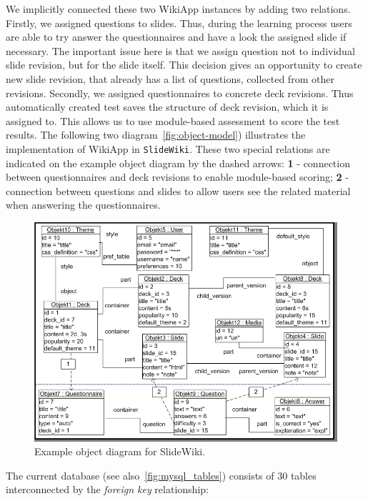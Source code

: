 \documentclass[PhD, Submit, ngerman,UKenglish,table]{scrbook}
\begin{document}
We implicitly connected these two WikiApp instances by adding two relations.
Firstly, we assigned questions to slides.
Thus, during the learning process users are able to try answer the questionnaires and have a look the assigned slide if necessary.
The important issue here is that we assign question not to individual slide revision, but for the slide itself.
This decision gives an opportunity to create new slide revision, that already has a list of questions, collected from other revisions.
Secondly, we assigned questionnaires to concrete deck revisions.
Thus automatically created test saves the structure of deck revision, which it is assigned to.
This allows us to use module-based assessment to score the test results.
The following two diagram~\autoref{fig:object-model}) illustrates the implementation of WikiApp in \texttt{SlideWiki}.
These two special relations are indicated on the example object diagram by the dashed arrows: \textbf{1} - connection between questionnaires and deck revisions to enable module-based scoring; \textbf{2} - connection between questions and slides to allow users see the related material when answering the questionnaires.

\begin{figure}[htb]
	\centering
		\includegraphics[width=\columnwidth]{images/object_diagramm.png}
	\caption{Example object diagram for SlideWiki.}
	\label{fig:object-model}
\end{figure}


The current database (see also~\autoref{fig:mysql_tables}) consists of 30 tables interconnected by the \emph{foreign key} relationship:
\end{document}
